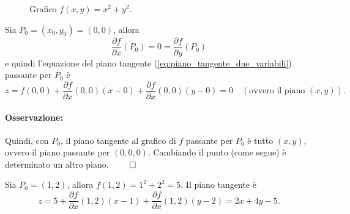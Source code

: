 \begin{example}
\begin{figure}[ht]
		\caption{Grafico $f(x,y)=x^2+y^2$.}\label{fig:esercizio_piano_tangente}
	\end{figure}
	
	\noindent Sia $P_0=(x_0,y_0)=(0,0)$, allora
	\begin{equation*}
		\frac{\partial f}{\partial x}(P_0) = 0= \frac{\partial f}{\partial y} (P_0)
	\end{equation*}
	e quindi l'equazione del piano tangente (\ref{eq:piano_tangente_due_variabili}) passante per $P_0$ è
	\begin{equation*}
		z=f(0,0) + \frac{\partial f}{\partial x} (0,0) (x-0) + \frac{\partial f}{\partial x} (0,0) (y-0) = 0\quad (\text{ovvero il piano }(x,y)).
	\end{equation*}
	
	\paragraph{Osservazione:} Quindi, con $P_0$, il piano tangente al grafico di $f$ passante per $P_0$ è tutto $(x,y)$, ovvero il piano passante per $(0,0,0)$. Cambiando il punto (come segue) è determinato un altro piano. $\qed$
	
	\noindent Sia $P_0=(1,2)$, allora $f(1,2)=1^2+2^2=5$. Il piano tangente è
	\begin{equation*}
		z=5 + \frac{\partial f}{\partial x} (1,2) (x-1) + \frac{\partial f}{\partial x} (1,2) (y-2) = 2x + 4y - 5.
	\end{equation*}
\end{example}

